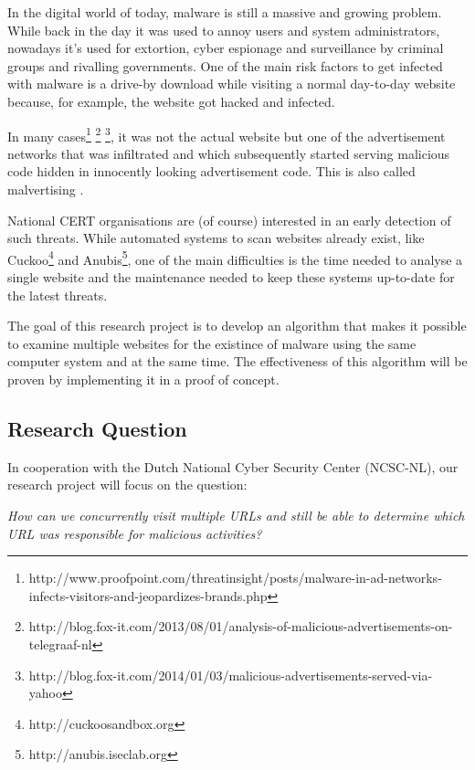 
In the digital world of today, malware is still a massive and growing problem. While back in the day it was used to annoy users and system administrators, nowadays it's used for extortion, cyber espionage and surveillance by criminal groups and rivalling governments. One of the main risk factors to get infected with malware is a drive-by download while visiting a normal day-to-day website because, for example, the website got hacked and infected. 

In many cases\footnote{http://www.proofpoint.com/threatinsight/posts/malware-in-ad-networks-infects-visitors-and-jeopardizes-brands.php} \footnote{http://blog.fox-it.com/2013/08/01/analysis-of-malicious-advertisements-on-telegraaf-nl} \footnote{http://blog.fox-it.com/2014/01/03/malicious-advertisements-served-via-yahoo}, it was not the actual website but one of the advertisement networks that was infiltrated and which subsequently started serving malicious code hidden in innocently looking advertisement code. This is also called malvertising \cite{Li2012}.

National CERT organisations are (of course) interested in an early detection of such threats. While automated systems to scan websites already exist, like Cuckoo\footnote{http://cuckoosandbox.org} and Anubis\footnote{http://anubis.iseclab.org}, one of the main difficulties is the time needed to analyse a single website and the maintenance needed to keep these systems up-to-date for the latest threats.

The goal of this research project is to develop an algorithm that makes it possible to examine multiple websites for the existince of malware using the same computer system and at the same time. The effectiveness of this algorithm will be proven by implementing it in a proof of concept.



\subsection{Research Question}

In cooperation with the Dutch National Cyber Security Center (NCSC-NL), our research project will focus on the question:

\textit{How can we concurrently visit multiple URLs and still be able to determine which URL was responsible for malicious activities?}


